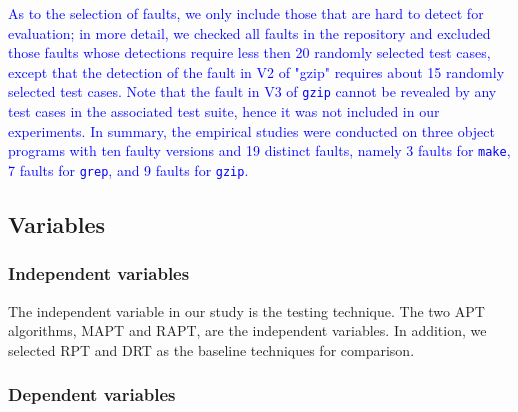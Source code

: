 \documentclass[10pt,journal,compsoc]{IEEEtran}
\begin{document}

\textcolor{blue}{As to the selection of faults, we only include those that are hard to detect for evaluation; in more detail, we checked all faults in the repository and excluded those faults whose detections require less then 20 randomly selected test cases, except that the detection of the fault in V2 of "gzip" requires about 15 randomly selected test cases. Note that the fault in V3 of \texttt{gzip} cannot be revealed by any test cases in the associated test suite, hence it was not included in our experiments.
In summary, the empirical studies were conducted on three object programs with ten faulty versions and 19 distinct faults, namely 3 faults for \texttt{make}, 7 faults for \texttt{grep}, and 9 faults for \texttt{gzip}.}

\subsection{Variables}

\subsubsection{Independent variables}
The independent variable in our study is the testing technique. The two APT algorithms, MAPT and RAPT, are the independent variables. In addition, we selected RPT and DRT as the baseline techniques for comparison.

\subsubsection{Dependent variables}
\end{document}
